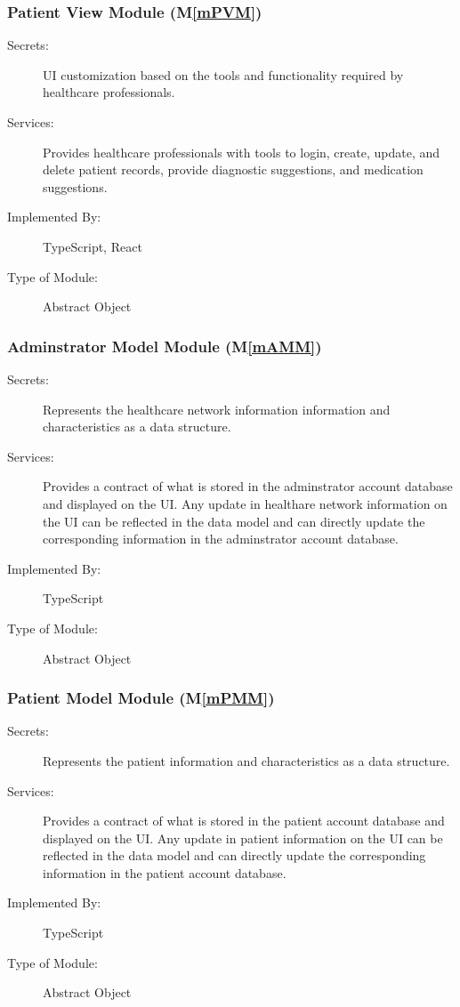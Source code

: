 \documentclass[12pt, titlepage]{article}
\newcommand{\mref}[1]{M\ref{#1}}
\begin{document}
\subsubsection{Patient View Module (\mref{mPVM})}

\begin{description}
\item[Secrets:]UI customization based on the tools and functionality required by healthcare professionals.
\item[Services:]Provides healthcare professionals with tools to login, create, update, and delete patient records, provide diagnostic suggestions, and medication suggestions.
\item[Implemented By:]TypeScript, React
\item[Type of Module:]Abstract Object
\end{description}

\subsubsection{Adminstrator Model Module (\mref{mAMM})}

\begin{description}
\item[Secrets:]Represents the healthcare network information information and characteristics as a data structure.
\item[Services:]Provides a contract of what is stored in the adminstrator account database and displayed on the UI. Any update in healthare network information on the UI can be reflected in the data model and can directly update the corresponding information in the adminstrator account database.
\item[Implemented By:]TypeScript
\item[Type of Module:]Abstract Object
\end{description}

\subsubsection{Patient Model Module (\mref{mPMM})}

\begin{description}
\item[Secrets:]Represents the patient information and characteristics as a data structure. 
\item[Services:]Provides a contract of what is stored in the patient account database and displayed on the UI. Any update in patient information on the UI can be reflected in the data model and can directly update the corresponding information in the patient account database.
\item[Implemented By:]TypeScript
\item[Type of Module:]Abstract Object
\end{description}
\end{document}

